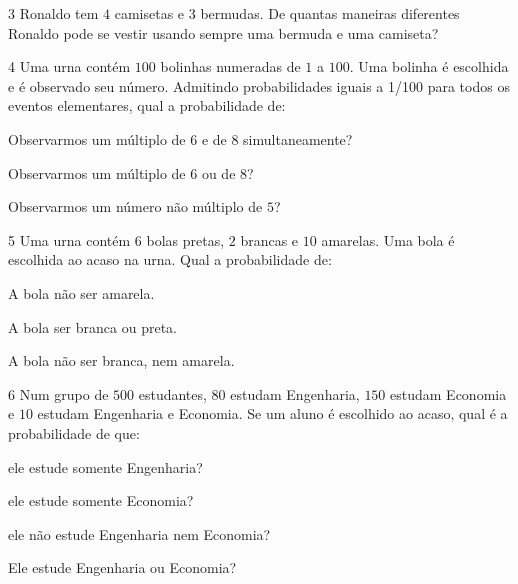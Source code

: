 {{{{\begin{escolha}
{\num{3}  Ronaldo tem $4$ camisetas e $3$ bermudas. De quantas maneiras diferentes
Ronaldo pode se vestir usando sempre uma bermuda e uma camiseta?


\num{4}  Uma urna contém $100$ bolinhas numeradas de $1$ a $100$. Uma bolinha é
escolhida e é observado seu número. Admitindo probabilidades iguais a
1/100 para todos os eventos elementares, qual a probabilidade de:

\begin{escolha}
\item Observarmos um múltiplo de $6$ e de $8$ simultaneamente? 
\item Observarmos um múltiplo de $6$ ou de $8$? 
\item Observarmos um número não múltiplo de $5$? 
\end{escolha}

\num{5}  Uma urna contém $6$ bolas pretas, $2$ brancas e $10$ amarelas. Uma bola é
escolhida ao acaso na urna. Qual a probabilidade de:

\begin{escolha}
\item A bola não ser amarela. 
\item A bola ser branca ou preta. 
\item A bola não ser branca, nem amarela. 
\end{escolha}

\num{6}  Num grupo de $500$ estudantes, $80$ estudam Engenharia, $150$ estudam
Economia e $10$ estudam Engenharia e Economia. Se um aluno é escolhido ao
acaso, qual é a probabilidade de que:

\begin{escolha}
\item ele estude somente Engenharia? 
\item ele estude somente Economia? 
\item ele não estude Engenharia nem Economia? 
\item Ele estude Engenharia ou Economia? 
\end{escolha}


}
\end{escolha}}}}}
